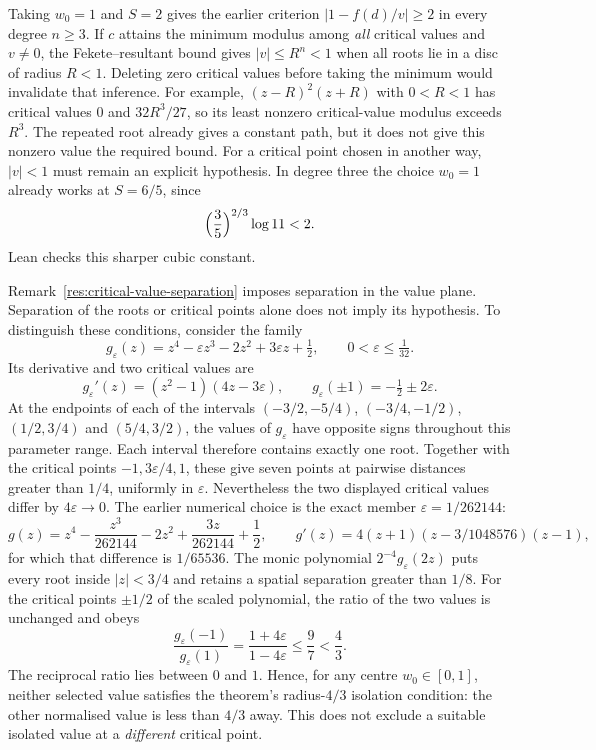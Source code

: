 \documentclass[11pt]{article}
\begin{document}
Taking $w_0=1$ and $S=2$ gives the earlier criterion
$|1-f(d)/v|\ge2$ in every degree $n\ge3$. If $c$ attains the minimum
modulus among \emph{all} critical values and $v\ne0$, the
Fekete--resultant bound gives $|v|\le R^n<1$ when all roots lie in a disc
of radius $R<1$. Deleting zero critical values before taking the minimum
would invalidate that inference. For example, $(z-R)^2(z+R)$ with $0<R<1$ has critical
values $0$ and $32R^3/27$, so its least nonzero critical-value modulus
exceeds $R^3$. The repeated root already gives a constant path, but it
does not give this nonzero value the required bound. For a critical point
chosen in another way, $|v|<1$ must remain an explicit hypothesis.
In degree three the choice $w_0=1$ already works at
$S=6/5$, since
\[
 \Bigl(\frac35\Bigr)^{2/3}\log 11<2.
\]
Lean checks this sharper cubic constant.

Remark~\ref{res:critical-value-separation} imposes separation in the
value plane. Separation of the roots or critical points alone does not
imply its hypothesis.
To distinguish these conditions, consider the family
\[
 g_\varepsilon(z)=z^4-\varepsilon z^3-2z^2+3\varepsilon z+\tfrac12,
 \qquad 0<\varepsilon\le\tfrac1{32}.
\]
Its derivative and two critical values are
\[
 g_\varepsilon'(z)=(z^2-1)(4z-3\varepsilon),\qquad
 g_\varepsilon(\pm1)=-\tfrac12\pm2\varepsilon.
\]
At the endpoints of each of the intervals
$(-3/2,-5/4)$, $(-3/4,-1/2)$, $(1/2,3/4)$ and $(5/4,3/2)$,
the values of $g_\varepsilon$ have opposite signs throughout this parameter
range. Each interval therefore contains exactly one root. Together with
the critical points $-1,3\varepsilon/4,1$, these give seven points at
pairwise distances greater than $1/4$, uniformly in $\varepsilon$.
Nevertheless the two displayed critical values differ by $4\varepsilon\to0$.
The earlier numerical choice is the exact member $\varepsilon=1/262144$:
\[
 g(z)=z^4-\frac{z^3}{262144}-2z^2+\frac{3z}{262144}+\frac12,
 \qquad
 g'(z)=4(z+1)(z-3/1048576)(z-1),
\]
for which that difference is $1/65536$.
The monic polynomial $2^{-4}g_\varepsilon(2z)$ puts every root inside
$|z|<3/4$ and retains a spatial separation greater than $1/8$.
For the critical points $\pm1/2$ of the scaled polynomial, the ratio
of the two values is unchanged and obeys
\[
 \frac{g_\varepsilon(-1)}{g_\varepsilon(1)}
 =\frac{1+4\varepsilon}{1-4\varepsilon}\le\frac97<\frac43.
\]
The reciprocal ratio lies between $0$ and $1$. Hence, for any centre
$w_0\in[0,1]$, neither selected value satisfies the theorem's
radius-$4/3$ isolation condition: the other normalised value is less
than $4/3$ away. This does not exclude a suitable isolated value at a
\emph{different} critical point.
\end{document}
